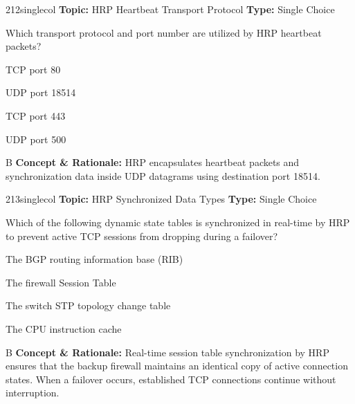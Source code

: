 \begin{qcard}{212}{singlecol}
\textcolor{darkslate!75}{\small\textbf{Topic:} HRP Heartbeat Transport Protocol \hfill \textbf{Type:} Single Choice}\vspace{0.4em}\par
Which transport protocol and port number are utilized by HRP heartbeat packets?
\begin{qoptions}
\item TCP port 80
\item UDP port 18514
\item TCP port 443
\item UDP port 500
\end{qoptions}
\end{qcard}
\nopagebreak
\begin{explainbox}{B}
\textbf{Concept \& Rationale:} HRP encapsulates heartbeat packets and synchronization data inside UDP datagrams using destination port 18514.
\end{explainbox}

\begin{qcard}{213}{singlecol}
\textcolor{darkslate!75}{\small\textbf{Topic:} HRP Synchronized Data Types \hfill \textbf{Type:} Single Choice}\vspace{0.4em}\par
Which of the following dynamic state tables is synchronized in real-time by HRP to prevent active TCP sessions from dropping during a failover?
\begin{qoptions}
\item The BGP routing information base (RIB)
\item The firewall Session Table
\item The switch STP topology change table
\item The CPU instruction cache
\end{qoptions}
\end{qcard}
\nopagebreak
\begin{explainbox}{B}
\textbf{Concept \& Rationale:} Real-time session table synchronization by HRP ensures that the backup firewall maintains an identical copy of active connection states. When a failover occurs, established TCP connections continue without interruption.
\end{explainbox}


